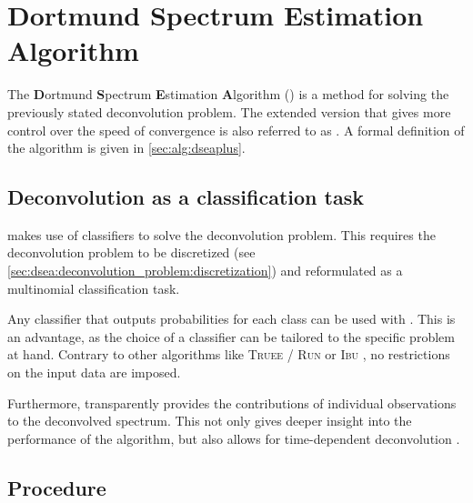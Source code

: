 \section{Dortmund Spectrum Estimation Algorithm} \label{sec:dsea:dsea}

The \textbf{D}ortmund \textbf{S}pectrum \textbf{E}stimation \textbf{A}lgorithm
  (\dsea{})
  \cite{dsea_unification}
is a method for solving the previously stated deconvolution problem.
The extended version \cite{dsea_mirko}
  that
    gives more control over the speed of convergence
is also referred to as \dseaplus{}.
%
A formal definition of the \dseaplus{} algorithm is given in \autoref{sec:alg:dseaplus}.


\subsection{Deconvolution as a classification task} %
\dsea{} makes use of classifiers to solve the deconvolution problem.
This requires the deconvolution problem to be
  discretized (see \autoref{sec:dsea:deconvolution_problem:discretization})
  and reformulated as a multinomial classification task.

Any classifier that outputs probabilities for each class
  can be used with \dsea{}.
This is an advantage,
  as the choice of a classifier can be tailored to the specific problem at hand.
Contrary to other algorithms like
  \textsc{Truee} / \textsc{Run} \cite{milke2013} or
  \textsc{Ibu} \cite{dagostini1995, dagostini2010},
no restrictions on the input data are imposed.

Furthermore,
\dsea{} transparently provides the contributions of individual observations to the deconvolved spectrum.
This not only gives deeper insight into the performance of the algorithm,
but also allows for time-dependent deconvolution \cite{dsea_mirko}. %


\subsection{Procedure}

